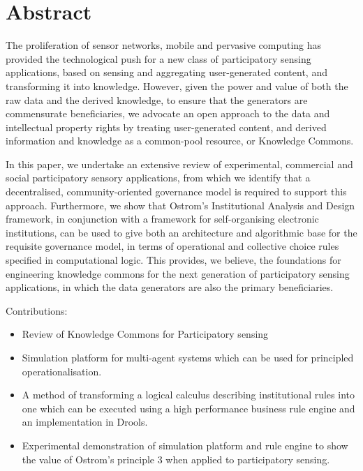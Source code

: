 \begingroup
\let\clearpage\relax
\let\cleardoublepage\relax
\let\cleardoublepage\relax

\chapter*{Abstract}

The proliferation of sensor networks, mobile and pervasive computing has provided the technological push
for a new class of participatory sensing applications, based on sensing and aggregating user-generated
content, and transforming it into knowledge. However, given the power and value of both the raw data
and the derived knowledge, to ensure that the generators are commensurate beneficiaries, we advocate an
open approach to the data and intellectual property rights by treating user-generated content, and derived
information and knowledge as a common-pool resource, or Knowledge Commons.

In this paper, we undertake an extensive review
of experimental, commercial and social participatory sensory applications, from which we identify that a
decentralised, community-oriented governance model is required to support this approach. Furthermore,
we show that Ostrom's Institutional Analysis and Design framework, in conjunction with a framework
for self-organising electronic institutions, can be used to give both an architecture and algorithmic base
for the requisite governance model, in terms of operational and collective choice rules specified in
computational logic. This provides, we believe, the foundations for engineering knowledge commons
for the next generation of participatory sensing applications, in which the data generators are also the
primary beneficiaries.

Contributions:
\begin{itemize}
\item Review of Knowledge Commons for Participatory sensing
\item Simulation platform for multi-agent systems which can be used for principled operationalisation.
\item A method of transforming a logical calculus describing institutional rules into one which can be executed using a high performance business rule engine and an implementation in Drools.
\item Experimental demonstration of simulation platform and rule engine to show the value of Ostrom's principle 3 when applied to participatory sensing.
\end{itemize}

